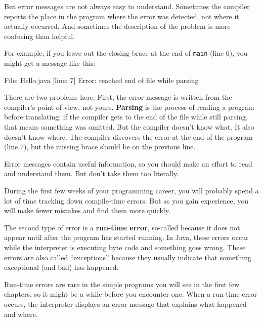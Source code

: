 \documentclass[12pt]{book}
\theoremstyle{exercise}
\newcommand{\java}[1]{\verb"#1"}
\begin{document}
But error messages are not always easy to understand.
Sometimes the compiler reports the place in the program where the error was detected, not where it actually occurred.
And sometimes the description of the problem is more confusing than helpful.

For example, if you leave out the closing brace at the end of \java{main} (line 6), you might get a message like this:

\begin{stdout}
File: Hello.java  [line: 7]
Error: reached end of file while parsing
\end{stdout}


There are two problems here.
First, the error message is written from the compiler's point of view, not yours.
{\bf Parsing} is the process of reading a program before translating; if the compiler gets to the end of the file while still parsing, that means something was omitted.
But the compiler doesn't know what.
It also doesn't know where.
The compiler discovers the error at the end of the program (line 7), but the missing brace should be on the previous line.

Error messages contain useful information, so you should make an effort to read and understand them.
But don't take them too literally.

During the first few weeks of your programming career, you will probably spend a lot of time tracking down compile-time errors.
But as you gain experience, you will make fewer mistakes and find them more quickly.



The second type of error is a {\bf run-time error}, so-called because it does not appear until after the program has started running.
In Java, these errors occur while the interpreter is executing byte code and something goes wrong.
These errors are also called ``exceptions'' because they usually indicate that something exceptional (and bad) has happened.

Run-time errors are rare in the simple programs you will see in the first few chapters, so it might be a while before you encounter one.
When a run-time error occurs, the interpreter displays an error message that explains what happened and where.
\end{document}
